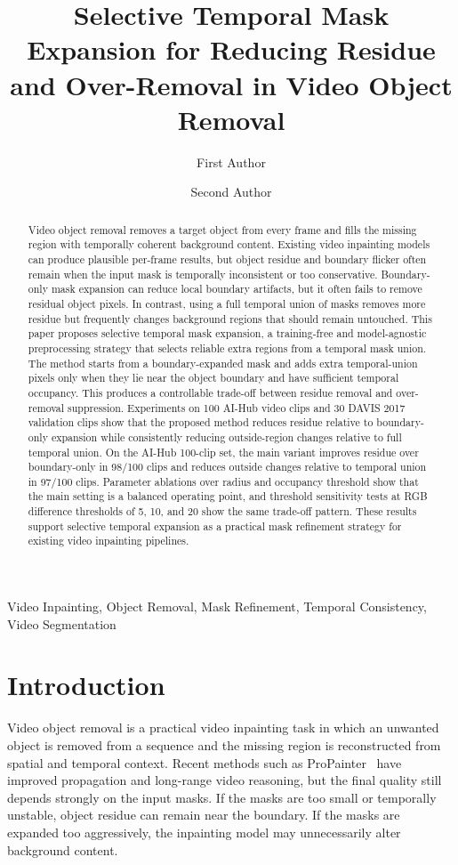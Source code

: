 \documentclass[nouppercase]{kaia}
\title{Selective Temporal Mask Expansion for Reducing Residue and Over-Removal in Video Object Removal}
\author{First Author}{a}
\author{Second Author}{a}
\affiliation{Department of Artificial Intelligence, Institution Name, City, Republic of Korea, \{first.author, second.author\}@example.com}{a}
\begin{document}
\maketitle
\begin{abstract}
Video object removal removes a target object from every frame and fills the missing region with temporally coherent background content. Existing video inpainting models can produce plausible per-frame results, but object residue and boundary flicker often remain when the input mask is temporally inconsistent or too conservative. Boundary-only mask expansion can reduce local boundary artifacts, but it often fails to remove residual object pixels. In contrast, using a full temporal union of masks removes more residue but frequently changes background regions that should remain untouched. This paper proposes selective temporal mask expansion, a training-free and model-agnostic preprocessing strategy that selects reliable extra regions from a temporal mask union. The method starts from a boundary-expanded mask and adds extra temporal-union pixels only when they lie near the object boundary and have sufficient temporal occupancy. This produces a controllable trade-off between residue removal and over-removal suppression. Experiments on 100 AI-Hub video clips and 30 DAVIS 2017 validation clips show that the proposed method reduces residue relative to boundary-only expansion while consistently reducing outside-region changes relative to full temporal union. On the AI-Hub 100-clip set, the main variant improves residue over boundary-only in 98/100 clips and reduces outside changes relative to temporal union in 97/100 clips. Parameter ablations over radius and occupancy threshold show that the main setting is a balanced operating point, and threshold sensitivity tests at RGB difference thresholds of 5, 10, and 20 show the same trade-off pattern. These results support selective temporal expansion as a practical mask refinement strategy for existing video inpainting pipelines.
\end{abstract}

\begin{keywords}
Video Inpainting, Object Removal, Mask Refinement, Temporal Consistency, Video Segmentation
\end{keywords}

\section{Introduction}
Video object removal is a practical video inpainting task in which an unwanted object is removed from a sequence and the missing region is reconstructed from spatial and temporal context. Recent methods such as ProPainter~\cite{zhou2023propainter} have improved propagation and long-range video reasoning, but the final quality still depends strongly on the input masks. If the masks are too small or temporally unstable, object residue can remain near the boundary. If the masks are expanded too aggressively, the inpainting model may unnecessarily alter background content.
\end{document}
